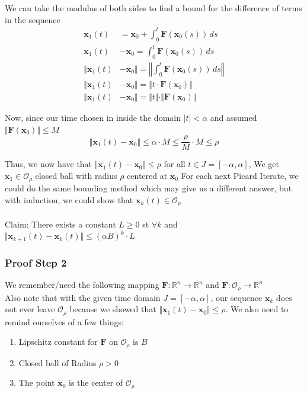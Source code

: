 \documentclass[12pt]{article}
\begin{document}
\noindent
We can take the modulus of both sides to find a bound for the difference of terms in the sequence
\begin{align*}
\mathbf{x}_1(t) &=  \mathbf{x}_0  + \int_{0}^{t} \mathbf{F}(\mathbf{x}_0(s)) \, ds \\
\mathbf{x}_1(t) &- \mathbf{x}_0  = \int_{0}^{t} \mathbf{F}(\mathbf{x}_0(s)) \, ds \\
\Vert \mathbf{x}_1(t) &- \mathbf{x}_0 \Vert = \left\Vert \int_{0}^{t} \mathbf{F}(\mathbf{x}_0(s)) \, ds \right\Vert \\
\Vert \mathbf{x}_1(t) &- \mathbf{x}_0 \Vert = \Vert t \cdot \mathbf{F}(\mathbf{x}_0)\Vert \\
\Vert \mathbf{x}_1(t) &- \mathbf{x}_0 \Vert = \Vert t \Vert \cdot \Vert \mathbf{F}(\mathbf{x}_0)\Vert 
\end{align*}

\noindent
Now, since our time chosen in inside the domain $|t| < \alpha$ and assumed $\Vert \mathbf{F}(\mathbf{x}_0) \Vert \leq M$ 
$$\Vert \mathbf{x}_1(t) - \mathbf{x}_0 \Vert \leq \alpha \cdot M \leq \frac{\rho}{M} \cdot M \leq \rho$$

\noindent
Thus, we now have that $\Vert \mathbf{x}_1(t) - \mathbf{x}_0 \Vert \leq \rho$ for all $t \in J=[-\alpha,\alpha]$, We get $\mathbf{x}_1 \in \mathcal{O}_\rho$ closed ball with radius $\rho$ centered at $\mathbf{x}_0$
For each next Picard Iterate, we could do the same bounding method which may give us a different answer, but with induction, we could show that $\mathbf{x}_k(t) \in \mathcal{O}_\rho$ 
\\\\
Claim: There exists a constant $L \geq 0$ st $\forall k$ and $\Vert \mathbf{x}_{k+1}(t) - \mathbf{x}_k(t) \Vert \leq (\alpha B)^k \cdot L$

\vspace{5cm}
\subsubsection*{Proof Step 2}
We remember/need the following mapping
$ \mathbf{F}: \mathbb{R}^n \rightarrow \mathbb{R}^n$ and $\mathbf{F}:\mathcal{O}_\rho \rightarrow \mathbb{R}^n$ \\
Also note that with the given time domain $J = [-\alpha, \alpha]$, our sequence $\mathbf{x}_k$ does not ever leave $\mathcal{O}_\rho$ because we showed that $\Vert \mathbf{x}_1(t) - \mathbf{x}_0 \Vert \leq \rho$.
We also need to remind ourselves of a few things: 
\begin{enumerate}
    \item Lipschitz constant for $\mathbf{F}$ on $\mathcal{O}_\rho$ is $B$ 
    \item Closed ball of Radius $\rho > 0$ 
    \item The point $\mathbf{x}_0$ is the center of $\mathcal{O}_\rho$
\end{enumerate}
\end{document}
